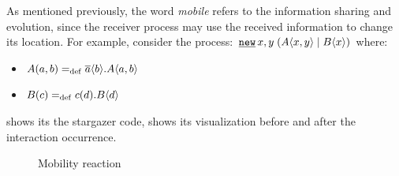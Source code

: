 As mentioned previously, the word \textit{mobile} refers to the information sharing and evolution, since the receiver process may use the received information to change its location. For example, consider the process: $\procres{x,y}{(\procpar{\proccall{A}{x,y}}{\proccall{B}{x}})}$ where:
\begin{itemize}
\item $A(a,b)=_{\mathrm{def}}{}\overline{a}\langle{b}\rangle.A\langle a,b\rangle$
\item $B(c)=_{\mathrm{def}}{}c({d}).B\langle d\rangle$
\end{itemize}


 shows its the stargazer code,   shows its visualization before and after the interaction occurrence.

\raggedbottom

\begin{figure}[H]%
\centering
{}%
\hfill
{}%
\caption{Mobility reaction}
\label{pi_mobility_stargazer_react}%
\end{figure}


